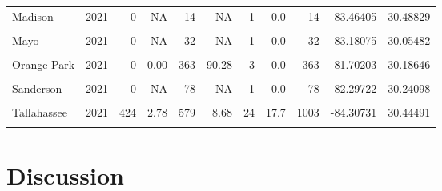 \documentclass{ufdissertation}[overrideChapters] %
\begin{document}
{\begin{table}[!h]
{\begin{tabular}[t]{lrrrrrrrrrr}
Madison & 2021 & 0 & NA & 14 & NA & 1 & 0.0 & 14 & -83.46405 & 30.48829\\
\cellcolor{gray!6}{Marianna} & \cellcolor{gray!6}{2021} & \cellcolor{gray!6}{0} & \cellcolor{gray!6}{NA} & \cellcolor{gray!6}{11} & \cellcolor{gray!6}{NA} & \cellcolor{gray!6}{1} & \cellcolor{gray!6}{0.0} & \cellcolor{gray!6}{11} & \cellcolor{gray!6}{-85.20554} & \cellcolor{gray!6}{30.76829}\\
Mayo & 2021 & 0 & NA & 32 & NA & 1 & 0.0 & 32 & -83.18075 & 30.05482\\
\cellcolor{gray!6}{Monticello} & \cellcolor{gray!6}{2021} & \cellcolor{gray!6}{0} & \cellcolor{gray!6}{NA} & \cellcolor{gray!6}{20} & \cellcolor{gray!6}{NA} & \cellcolor{gray!6}{1} & \cellcolor{gray!6}{0.0} & \cellcolor{gray!6}{20} & \cellcolor{gray!6}{-83.87114} & \cellcolor{gray!6}{30.54514}\\
\addlinespace
Orange Park & 2021 & 0 & 0.00 & 363 & 90.28 & 3 & 0.0 & 363 & -81.70203 & 30.18646\\
\cellcolor{gray!6}{Perry} & \cellcolor{gray!6}{2021} & \cellcolor{gray!6}{0} & \cellcolor{gray!6}{NA} & \cellcolor{gray!6}{3} & \cellcolor{gray!6}{NA} & \cellcolor{gray!6}{1} & \cellcolor{gray!6}{0.0} & \cellcolor{gray!6}{3} & \cellcolor{gray!6}{-83.57833} & \cellcolor{gray!6}{30.11150}\\
Sanderson & 2021 & 0 & NA & 78 & NA & 1 & 0.0 & 78 & -82.29722 & 30.24098\\
\cellcolor{gray!6}{Sneads} & \cellcolor{gray!6}{2021} & \cellcolor{gray!6}{0} & \cellcolor{gray!6}{NA} & \cellcolor{gray!6}{1} & \cellcolor{gray!6}{NA} & \cellcolor{gray!6}{1} & \cellcolor{gray!6}{0.0} & \cellcolor{gray!6}{1} & \cellcolor{gray!6}{-84.91279} & \cellcolor{gray!6}{30.71067}\\
Tallahassee & 2021 & 424 & 2.78 & 579 & 8.68 & 24 & 17.7 & 1003 & -84.30731 & 30.44491\\
\addlinespace
\cellcolor{gray!6}{Grand Totals} & \cellcolor{gray!6}{2021} & \cellcolor{gray!6}{8679} & \cellcolor{gray!6}{NA} & \cellcolor{gray!6}{4674} & \cellcolor{gray!6}{NA} & \cellcolor{gray!6}{425} & \cellcolor{gray!6}{127.9} & \cellcolor{gray!6}{13353} & \cellcolor{gray!6}{-83.71379} & \cellcolor{gray!6}{30.25158}\\
\bottomrule
\end{tabular}}
\end{table}
\hypertarget{discussion}{%
\section{Discussion}\label{discussion}}

}
\end{document}
